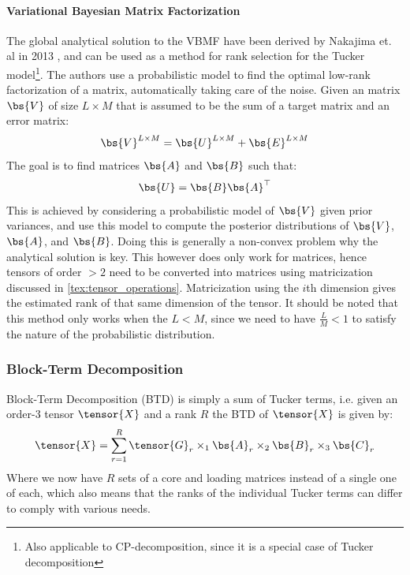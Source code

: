 \paragraph{Variational Bayesian Matrix Factorization} \label{tex:VBMF}
The global analytical solution to the VBMF have been derived by Nakajima et. al in 2013 \cite{Nakajima2013}, and can be used as a method for rank selection for the Tucker model\footnote{Also applicable to CP-decomposition, since it is a special case of Tucker decomposition}. The authors use a probabilistic model to find the optimal low-rank factorization of a matrix, automatically taking care of the noise. Given an matrix $\bs{V}$ of size $L\times M$ that is assumed to be the sum of a target matrix and an error matrix:
\begin{equation}
    \bs{V}^{L\times M} = \bs{U}^{L\times M} + \bs{E}^{L\times M}
\end{equation}
The goal is to find matrices $\bs{A}$ and $\bs{B}$ such that:
\begin{equation}
    \bs{U} = \bs{B}\bs{A}^{\top}
\end{equation}
This is achieved by considering a probabilistic model of $\bs{V}$ given prior variances, and use this model to compute the posterior distributions of $\bs{V}$, $\bs{A}$, and $\bs{B}$. Doing this is generally a non-convex problem why the analytical solution is key. This however does only work for matrices, hence tensors of order $> 2$ need to be converted into matrices using matricization discussed in \autoref{tex:tensor_operations}. Matricization using the $i$th dimension gives the estimated rank of that same dimension of the tensor. It should be noted that this method only works when the $L < M$, since we need to have $\frac{L}{M} < 1$ to satisfy the nature of the probabilistic distribution.

\subsubsection{Block-Term Decomposition}
Block-Term Decomposition (BTD) is simply a sum of Tucker terms, i.e. given an order-3 tensor $\tensor{X}$ and a rank $R$ the BTD of $\tensor{X}$ is given by:
\begin{equation}
    \tensor{X} = \sum_{r=1}^R \tensor{G}_r \times_1 \bs{A}_r \times_2 \bs{B}_r \times_3 \bs{C}_r
\end{equation}
Where we now have $R$ sets of a core and loading matrices instead of a single one of each, which also means that the ranks of the individual Tucker terms can differ to comply with various needs.

